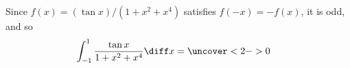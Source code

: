 \begin{frame}
\begin{example}[Example 10, p. 381]
Since $f(x) = (\tan x)/ (1 + x^2 + x^4) $ satisfies $f(-x) = -f(x)$, it is odd, and so
\abovedisplayskip=0pt
\belowdisplayskip=0pt
\begin{align*}
\int_{-1}^1 \frac{\tan x}{1+x^2+x^4} \diff x%
& = %
\uncover<2->{%
0%
}%
\end{align*}
\end{example}
\end{frame}
